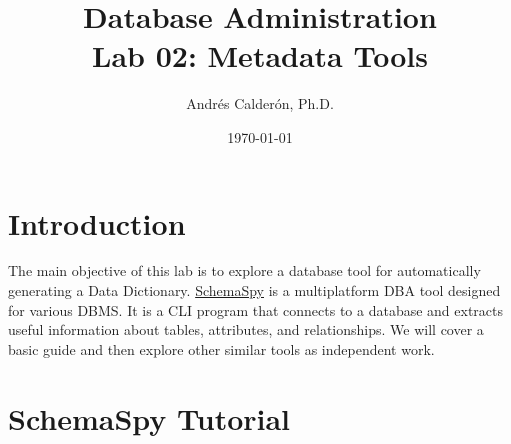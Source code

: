 \documentclass{article}
\title{Database Administration \\ Lab 02: Metadata Tools}
\author{Andrés Calderón, Ph.D.}
\date{\today}
\begin{document}
\maketitle

\section{Introduction}
The main objective of this lab is to explore a database tool for automatically generating a Data Dictionary. \href{https://schemaspy.org/}{SchemaSpy} is a multiplatform DBA tool designed for various DBMS. It is a CLI program that connects to a database and extracts useful information about tables, attributes, and relationships. We will cover a basic guide and then explore other similar tools as independent work.

\section{SchemaSpy Tutorial}
\end{document}
